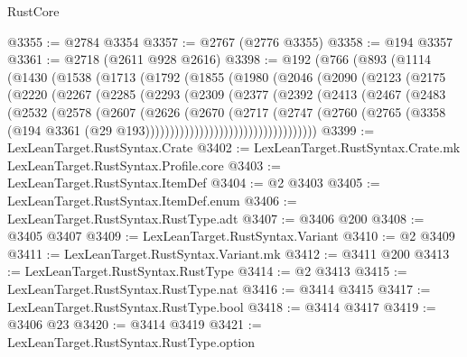 \begin{lexlean}{RustCore}
\begin{coremodule}
@3355 := @2784 @3354
@3357 := @2767 (@2776 @3355)
@3358 := @194 @3357
@3361 := @2718 (@2611 @928 @2616)
@3398 := @192
    (@766
      (@893
        (@1114
          (@1430
            (@1538
              (@1713
                (@1792
                  (@1855
                    (@1980
                      (@2046
                        (@2090
                          (@2123
                            (@2175
                              (@2220
                                (@2267
                                  (@2285
                                    (@2293
                                      (@2309
                                        (@2377
                                          (@2392
                                            (@2413
                                              (@2467
                                                (@2483
                                                  (@2532
                                                    (@2578
                                                      (@2607
                                                        (@2626
                                                          (@2670
                                                            (@2717
                                                              (@2747
                                                                (@2760
                                                                  (@2765
                                                                    (@3358
                                                                      (@194
                                                                        @3361
                                                                        (@29
                                                                          @193)))))))))))))))))))))))))))))))))))
@3399 := LexLeanTarget.RustSyntax.Crate
@3402 := LexLeanTarget.RustSyntax.Crate.mk LexLeanTarget.RustSyntax.Profile.core
@3403 := LexLeanTarget.RustSyntax.ItemDef
@3404 := @2 @3403
@3405 := LexLeanTarget.RustSyntax.ItemDef.enum
@3406 := LexLeanTarget.RustSyntax.RustType.adt
@3407 := @3406 @200
@3408 := @3405 @3407
@3409 := LexLeanTarget.RustSyntax.Variant
@3410 := @2 @3409
@3411 := LexLeanTarget.RustSyntax.Variant.mk
@3412 := @3411 @200
@3413 := LexLeanTarget.RustSyntax.RustType
@3414 := @2 @3413
@3415 := LexLeanTarget.RustSyntax.RustType.nat
@3416 := @3414 @3415
@3417 := LexLeanTarget.RustSyntax.RustType.bool
@3418 := @3414 @3417
@3419 := @3406 @23
@3420 := @3414 @3419
@3421 := LexLeanTarget.RustSyntax.RustType.option

\end{coremodule}
\end{lexlean}
